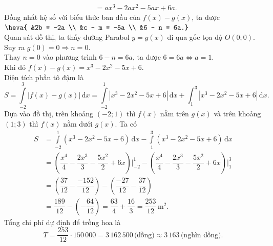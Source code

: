 \begin{ex}
{\begin{align*}
			&= ax^3 - 2ax^2 - 5ax + 6a.
		\end{align*}
		Đồng nhất hệ số với biểu thức ban đầu của $f(x) - g(x)$, ta được $\heva{
			&2b = -2a \\
			&c - m = -5a \\
			&6 - n = 6a.}$\\
		Quan sát đồ thị, ta thấy đường Parabol $y = g(x)$ đi qua gốc tọa độ $O(0;0)$.\\
		Suy ra $g(0) = 0 \Rightarrow n = 0$.\\
		Thay $n = 0$ vào phương trình $6 - n = 6a$, ta được $6 = 6a \Leftrightarrow a = 1$.\\
		Khi đó $f(x) - g(x) = x^3 - 2x^2 - 5x + 6$.\\
		Diện tích phần tô đậm là
		\[S =\displaystyle\int\limits_{-2}^{3} \left| f(x) - g(x)\right|  \mathrm{\,d}x =\displaystyle\int\limits_{-2}^{1} \left| x^3 - 2x^2 - 5x + 6\right|  \mathrm{\,d}x + \int_{1}^{3} \left| x^3 - 2x^2 - 5x + 6\right|  \mathrm{\,d}x.\]
		Dựa vào đồ thị, trên khoảng $(-2; 1)$ thì $f(x)$ nằm trên $g(x)$ và trên khoảng $(1; 3)$ thì $f(x)$ nằm dưới $g(x)$. Ta có
		\begin{align*}
			S &=\displaystyle\int\limits_{-2}^{1} \left( x^3 - 2x^2 - 5x + 6\right) \mathrm{\,d}x - \displaystyle\int\limits_{1}^{3} \left( x^3 - 2x^2 - 5x + 6\right)  \mathrm{\,d}x \\
			&= \left( \dfrac{x^4}{4} - \dfrac{2x^3}{3} - \dfrac{5x^2}{2} + 6x \right) \Bigg|_{-2}^{1} - \left( \dfrac{x^4}{4} - \dfrac{2x^3}{3} - \dfrac{5x^2}{2} + 6x \right) \Bigg|_{1}^{3} \\
			&= \left( \dfrac{37}{12} - \dfrac{-152}{12} \right) - \left( \dfrac{-27}{12} - \dfrac{37}{12} \right) \\
			&= \dfrac{189}{12} - \left( -\dfrac{64}{12} \right) = \dfrac{63}{4} + \dfrac{16}{3} = \dfrac{253}{12}\,\text{m}^2.
		\end{align*}
		Tổng chi phí dự định để trồng hoa là
		\[T = \dfrac{253}{12} \cdot 150\,000 = 3\,162\,500\, \text{(đồng)}\approx 3\,163\, \text{(nghìn đồng).}\]
	}
\end{ex}

